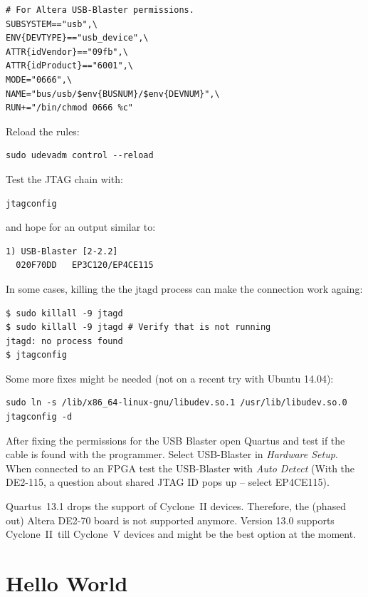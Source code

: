 \documentclass[a4paper,fontsize=10pt,twoside,DIV15,BCOR12mm,headinclude=true,footinclude=false,pagesize,bibtotoc]{scrbook}
\begin{document}
\begin{verbatim}
# For Altera USB-Blaster permissions.
SUBSYSTEM=="usb",\
ENV{DEVTYPE}=="usb_device",\
ATTR{idVendor}=="09fb",\
ATTR{idProduct}=="6001",\
MODE="0666",\
NAME="bus/usb/$env{BUSNUM}/$env{DEVNUM}",\
RUN+="/bin/chmod 0666 %c"
\end{verbatim}

Reload the rules:
\begin{verbatim}
sudo udevadm control --reload
\end{verbatim}

Test the JTAG chain with:
\begin{verbatim}
jtagconfig
\end{verbatim}

and hope for an output similar to:

\begin{verbatim}
1) USB-Blaster [2-2.2]
  020F70DD   EP3C120/EP4CE115
\end{verbatim}

In some cases, killing the the jtagd process can make the connection work againg:

\begin{verbatim}
$ sudo killall -9 jtagd
$ sudo killall -9 jtagd # Verify that is not running
jtagd: no process found
$ jtagconfig
\end{verbatim}

Some more fixes might be needed (not on a recent try with Ubuntu 14.04):

\begin{verbatim}
sudo ln -s /lib/x86_64-linux-gnu/libudev.so.1 /usr/lib/libudev.so.0
jtagconfig -d
\end{verbatim}


After fixing the permissions for the USB Blaster open Quartus and test if the
cable is found with the programmer. Select USB-Blaster in \emph{Hardware Setup}.
When connected to an FPGA test the USB-Blaster with \emph{Auto Detect}
(With the DE2-115, a question about shared JTAG ID pops up -- select EP4CE115).

Quartus~13.1 drops the support of Cyclone~II devices. Therefore, the
(phased out) Altera DE2-70 board is not supported anymore. Version 13.0 supports Cyclone~II\
till Cyclone~V devices and might be the best option at the moment.


\section{Hello World}
\end{document}
